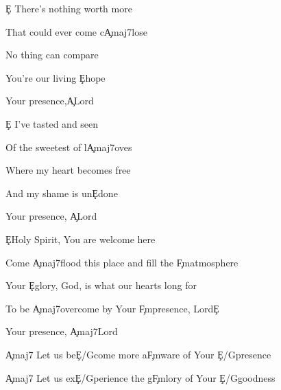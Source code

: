 \documentclass[9pt]{extarticle}
\begin{document}
\bsong

\bv
\c{E} There's nothing worth more

That could ever come c\c{Amaj7}lose

No thing can compare

You're our living \c{E}hope

Your presence,\c{A}Lord
\ev

\bv
\c{E} I've tasted and seen

Of the sweetest of l\c{Amaj7}oves

Where my heart becomes free

And my shame is un\c{E}done

Your presence, \c{A}Lord
\ev

\bc
\c{E}Holy Spirit, You are welcome here

Come \c{Amaj7}flood this place and fill the \c{F\s m}atmosphere

Your \c{E}glory, God, is what our hearts long for

To be \c{Amaj7}overcome by Your \c{F\s m}presence, Lord\c{E}

Your presence, \c{Amaj7}Lord
\ec




\bb[4]
\c{Amaj7} Let us be\c{E/G\s }come more a\c{F\s m}ware of Your \c{E/G\s }presence

\c{Amaj7} Let us ex\c{E/G\s }perience the g\c{F\s m}lory of Your \c{E/G\s }goodness
\eb


\esong
\end{document}

